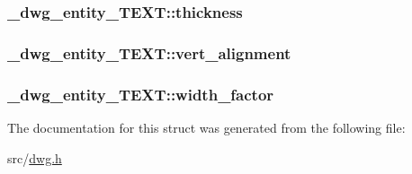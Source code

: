 \hypertarget{struct__dwg__entity__TEXT_ab25a9957875678020b7dad3b2ab46f8a}{
\subsubsection[{thickness}]{ {\bf \-\_\-dwg\-\_\-entity\-\_\-\-T\-E\-X\-T\-::thickness}}}\label{struct__dwg__entity__TEXT_ab25a9957875678020b7dad3b2ab46f8a}
\hypertarget{struct__dwg__entity__TEXT_a8c5864350ebfec619231b2b0bcd95980}{
\subsubsection[{vert\-\_\-alignment}]{ {\bf \-\_\-dwg\-\_\-entity\-\_\-\-T\-E\-X\-T\-::vert\-\_\-alignment}}}\label{struct__dwg__entity__TEXT_a8c5864350ebfec619231b2b0bcd95980}
\hypertarget{struct__dwg__entity__TEXT_a47dbce0c9c2e5f5516b1335c3cb74b79}{
\subsubsection[{width\-\_\-factor}]{ {\bf \-\_\-dwg\-\_\-entity\-\_\-\-T\-E\-X\-T\-::width\-\_\-factor}}}\label{struct__dwg__entity__TEXT_a47dbce0c9c2e5f5516b1335c3cb74b79}


\-The documentation for this struct was generated from the following file\-:\begin{DoxyCompactItemize}
\item 
src/\hyperlink{dwg_8h}{dwg.\-h}\end{DoxyCompactItemize}
